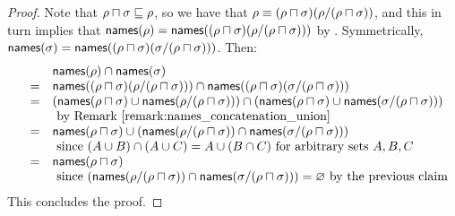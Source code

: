 \begin{proof}
Note that $\rho \sqcap \sigma \sqsubseteq \rho$,
so we have that $\rho \equiv (\rho \sqcap \sigma)(\rho/(\rho \sqcap \sigma))$,
and this in turn implies that
$\mathsf{names}(\rho) = \mathsf{names}((\rho \sqcap \sigma)(\rho/(\rho \sqcap \sigma)))$
by .
Symmetrically,
$\mathsf{names}(\sigma) = \mathsf{names}((\rho \sqcap \sigma)(\sigma/(\rho \sqcap \sigma)))$.
Then:
\[
  \begin{array}{rcll}
    &&  \names(\redseq) \cap \names(\redseqtwo) \\
  & = & \names((\redseq \sqcap \redseqtwo)(\redseq/(\redseq \sqcap \redseqtwo))) \cap \names((\redseq \sqcap \redseqtwo)(\redseqtwo/(\redseq \sqcap \redseqtwo))) \\
  & = & \left(\names(\redseq \sqcap \redseqtwo) \cup \names(\redseq/(\redseq \sqcap \redseqtwo))\right) \cap \left(\names(\redseq \sqcap \redseqtwo) \cup \names(\redseqtwo/(\redseq \sqcap \redseqtwo))\right) \\
     && \text{ by \rremark{names_concatenation_union}} \\
  & = &
        \names(\redseq \sqcap \redseqtwo) \cup 
        \left( \names(\redseq/(\redseq \sqcap \redseqtwo)) \cap \names(\redseqtwo/(\redseq \sqcap \redseqtwo)) \right) \\
  && \text{ since $(A \cup B) \cap (A \cup C) = A \cup (B \cap C)$ for arbitrary sets $A,B,C$} \\
  & = &
        \names(\redseq \sqcap \redseqtwo) \\
  && \text{ since $\left( \names(\redseq/(\redseq \sqcap \redseqtwo)) \cap \names(\redseqtwo/(\redseq \sqcap \redseqtwo)) \right) = \emptyset$ by the previous claim} \\
  \end{array}
\]
This concludes the proof.
\end{proof}

